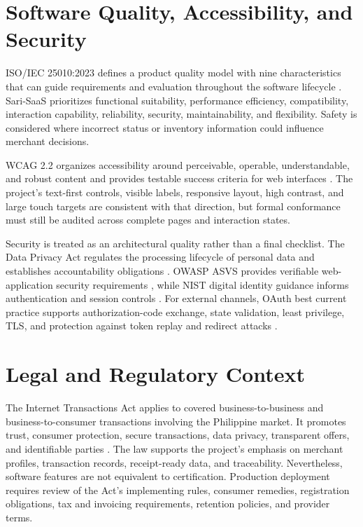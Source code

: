 \documentclass[12pt,oneside]{report}
\begin{document}
\section{Software Quality, Accessibility, and Security}
ISO/IEC 25010:2023 defines a product quality model with nine characteristics
that can guide requirements and evaluation throughout the software lifecycle
\parencite{iso25010}. Sari-SaaS prioritizes functional suitability,
performance efficiency, compatibility, interaction capability, reliability,
security, maintainability, and flexibility. Safety is considered where
incorrect status or inventory information could influence merchant decisions.

WCAG 2.2 organizes accessibility around perceivable, operable, understandable,
and robust content and provides testable success criteria for web interfaces
\parencite{w3c2024wcag}. The project's text-first controls, visible labels,
responsive layout, high contrast, and large touch targets are consistent with
that direction, but formal conformance must still be audited across complete
pages and interaction states.

Security is treated as an architectural quality rather than a final checklist.
The Data Privacy Act regulates the processing lifecycle of personal data and
establishes accountability obligations \parencite{philippines2012dpa}. OWASP
ASVS provides verifiable web-application security requirements
\parencite{owasp2025asvs}, while NIST digital identity guidance informs
authentication and session controls \parencite{nist2025identity}. For external
channels, OAuth best current practice supports authorization-code exchange,
state validation, least privilege, TLS, and protection against token replay and
redirect attacks \parencite{rfc9700oauth}.

\section{Legal and Regulatory Context}
The Internet Transactions Act applies to covered business-to-business and
business-to-consumer transactions involving the Philippine market. It promotes
trust, consumer protection, secure transactions, data privacy, transparent
offers, and identifiable parties \parencite{philippines2023ita}. The law
supports the project's emphasis on merchant profiles, transaction records,
receipt-ready data, and traceability. Nevertheless, software features are not
equivalent to certification. Production deployment requires review of the Act's
implementing rules, consumer remedies, registration obligations, tax and
invoicing requirements, retention policies, and provider terms.
\end{document}
